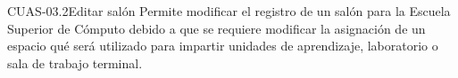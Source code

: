 \begin{UseCase}{CUAS-03.2}{Editar salón}{
	Permite modificar el registro de un salón para la Escuela Superior de Cómputo debido a que se requiere modificar la asignación de un espacio qué será utilizado para impartir unidades de aprendizaje, laboratorio o sala de trabajo terminal. \\
    }


%			


\end{UseCase}
